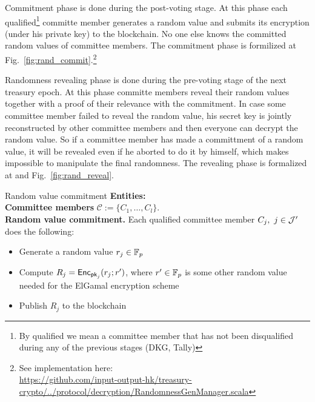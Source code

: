 Commitment phase is done during the post-voting stage. At this phase each qualified\footnote{By qualified we mean a committee member that has not been disqualified during any of the previous stages (DKG, Tally)} committe member generates a random value and submits its encryption (under his private key) to the blockchain. No one else knows the committed random values of committee members. The commitment phase is formilized at Fig.~\ref{fig:rand_commit}.\footnote{See implementation here:\\ \href{https://github.com/input-output-hk/treasury-crypto/blob/master/src/main/scala/io/iohk/protocol/decryption/RandomnessGenManager.scala}{https://github.com/input-output-hk/treasury-crypto/../protocol/decryption/RandomnessGenManager.scala}}

Randomness revealing phase is done during the pre-voting stage of the next treasury epoch. At this phase committe members reveal their random values together with a proof of their relevance with the commitment. In case some committee member failed to reveal the random value, his secret key is jointly reconstructed by other committee members and then everyone can decrypt the random value. So if a committee member has made a committment of a random value, it will be revealed even if he aborted to do it by himself, which makes impossible to manipulate the final randomness. The revealing phase is formalized at and Fig.~\ref{fig:rand_reveal}.

\begin{boxfig}{\label{fig:rand_commit}Random value commitment}{}
\footnotesize
\textbf{Entities:}\\
    \hspace*{6mm} \textbf{Committee members} $\mathcal{C}:=\{C_1,\ldots, C_l \}$.\\

\textbf{Random value commitment.}
Each qualified committee member $C_j,~j\in\mathcal{J}'$ does the following:
\begin{itemize}
	\item Generate a random value $r_j\in\mathbb{F}_p$
	\item Compute $R_j=\mathsf{Enc}_{\mathsf{pk}_j}(r_j;r')$, where $r'\in\mathbb{F}_p$ is some other random value needed for the ElGamal encryption scheme
    \item Publish $R_j$ to the blockchain
\end{itemize}
\end{boxfig}


